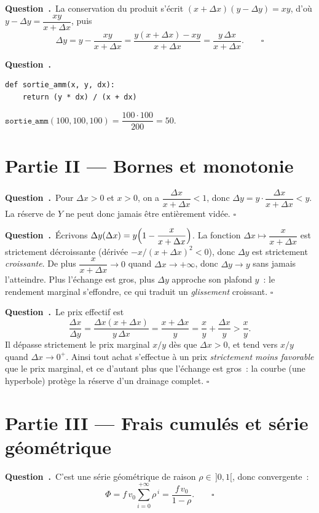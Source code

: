 \documentclass[11pt,a4paper]{article}
\newcounter{qcnt}
\newcommand{\Q}{\medskip\par\stepcounter{qcnt}\noindent\textbf{Question~\theqcnt.}~}
\begin{document}
\Q La conservation du produit s'écrit $(x+\Delta x)(y-\Delta y) = xy$, d'où
$y - \Delta y = \dfrac{xy}{x+\Delta x}$, puis
$$\Delta y = y - \frac{xy}{x+\Delta x} = \frac{y(x+\Delta x) - xy}{x+\Delta x}
= \frac{y\,\Delta x}{x+\Delta x}. \qquad \square$$

\Q
\begin{lstlisting}
def sortie_amm(x, y, dx):
    return (y * dx) / (x + dx)
\end{lstlisting}
$\mathtt{sortie\_amm}(100,100,100) = \dfrac{100\cdot100}{200} = 50$.

\section*{Partie II --- Bornes et monotonie}

\Q Pour $\Delta x > 0$ et $x > 0$, on a $\dfrac{\Delta x}{x+\Delta x} < 1$, donc
$\Delta y = y\cdot\dfrac{\Delta x}{x+\Delta x} < y$. La réserve de $Y$ ne peut donc jamais être
entièrement vidée. $\square$

\Q Écrivons $\Delta y(\Delta x) = y\Bigl(1 - \dfrac{x}{x+\Delta x}\Bigr)$. La fonction
$\Delta x \mapsto \dfrac{x}{x+\Delta x}$ est strictement décroissante (dérivée
$-x/(x+\Delta x)^2 < 0$), donc $\Delta y$ est strictement \emph{croissante}. De plus
$\dfrac{x}{x+\Delta x} \to 0$ quand $\Delta x \to +\infty$, donc $\Delta y \to y$ sans jamais
l'atteindre. Plus l'échange est gros, plus $\Delta y$ approche son plafond $y$~: le rendement
marginal s'effondre, ce qui traduit un \emph{glissement} croissant. $\square$

\Q Le prix effectif est
$$\frac{\Delta x}{\Delta y} = \frac{\Delta x (x+\Delta x)}{y\,\Delta x}
= \frac{x+\Delta x}{y} = \frac{x}{y} + \frac{\Delta x}{y} > \frac{x}{y}.$$
Il dépasse strictement le prix marginal $x/y$ dès que $\Delta x > 0$, et tend vers $x/y$ quand
$\Delta x \to 0^{+}$. Ainsi tout achat s'effectue à un prix \emph{strictement moins favorable}
que le prix marginal, et ce d'autant plus que l'échange est gros~: la courbe (une hyperbole)
protège la réserve d'un drainage complet. $\square$

\section*{Partie III --- Frais cumulés et série géométrique}

\Q C'est une série géométrique de raison $\rho \in\, ]0,1[$, donc convergente~:
$$\Phi = f\,v_0 \sum_{i=0}^{+\infty} \rho^{\,i} = \frac{f\,v_0}{1-\rho}. \qquad \square$$
\end{document}
